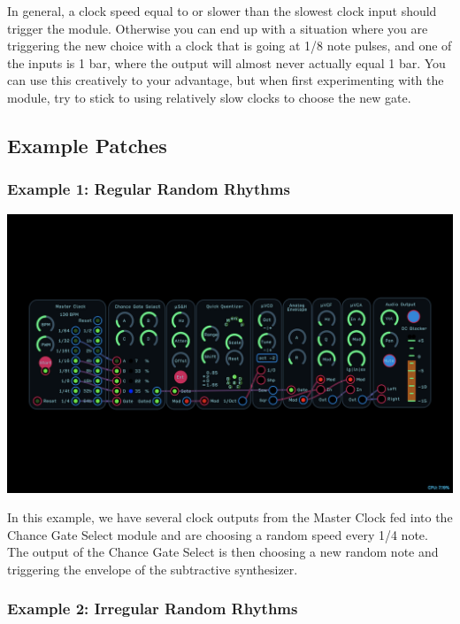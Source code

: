 \documentclass[11pt]{book}
\begin{document}
\begin{multicols*}{2}
In general, a clock speed equal to or slower than the slowest clock input should trigger the module. Otherwise you can end up with a situation where you are triggering the new choice with a clock that is going at 1/8 note pulses, and one of the inputs is 1 bar, where the output will almost never actually equal 1 bar. You can use this creatively to your advantage, but when first experimenting with the module, try to stick to using relatively slow clocks to choose the new gate.

\subsection*{Example Patches}

\subsubsection*{Example 1: Regular Random Rhythms}

\begin{center}
\includegraphics[width=0.95\linewidth]{chance-gate-select-fig5.png}
\end{center}

In this example, we have several clock outputs from the Master Clock fed into the Chance Gate Select module and are choosing a random speed every 1/4 note. The output of the Chance Gate Select is then choosing a new random note and triggering the envelope of the subtractive synthesizer.

\subsubsection*{Example 2: Irregular Random Rhythms}


\end{multicols*}
\end{document}
